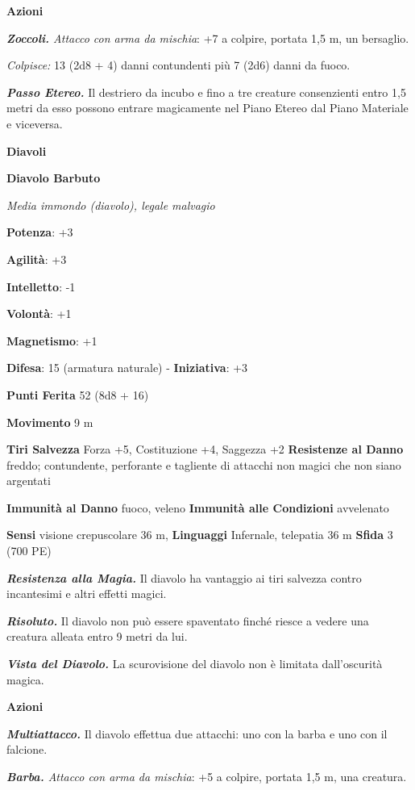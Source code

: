 \begin{multicols}{2}
\textbf{Azioni}

\emph{\textbf{Zoccoli.} Attacco con arma da mischia}: +7 a colpire,
portata 1,5 m, un bersaglio.

\emph{Colpisce:} 13 (2d8 + 4) danni contundenti più 7 (2d6) danni da
fuoco.

\emph{\textbf{Passo Etereo.}} Il destriero da incubo e fino a tre
creature consenzienti entro 1,5 metri da esso possono entrare
magicamente nel Piano Etereo dal Piano Materiale e viceversa.

\textbf{Diavoli}

\textbf{Diavolo Barbuto}

\emph{Media immondo (diavolo), legale malvagio}

\textbf{Potenza}: +3

\textbf{Agilità}: +3

\textbf{Intelletto}: -1

\textbf{Volontà}: +1

\textbf{Magnetismo}: +1

\textbf{Difesa}: 15 (armatura naturale) - \textbf{Iniziativa}: +3

\textbf{Punti Ferita} 52 (8d8 + 16)

\textbf{Movimento} 9 m

\textbf{Tiri Salvezza} Forza +5, Costituzione +4, Saggezza +2
\textbf{Resistenze al Danno} freddo; contundente, perforante e tagliente
di attacchi non magici che non siano argentati

\textbf{Immunità al Danno} fuoco, veleno \textbf{Immunità alle
Condizioni} avvelenato

\textbf{Sensi} visione crepuscolare 36 m, 
\textbf{Linguaggi} Infernale, telepatia 36 m \textbf{Sfida} 3 (700 PE)

\emph{\textbf{Resistenza alla Magia.}} Il diavolo ha vantaggio ai tiri
salvezza contro incantesimi e altri effetti magici.

\emph{\textbf{Risoluto.}} Il diavolo non può essere spaventato finché
riesce a vedere una creatura alleata entro 9 metri da lui.

\emph{\textbf{Vista del Diavolo.}} La scurovisione del diavolo non è
limitata dall'oscurità magica.

\textbf{Azioni}

\emph{\textbf{Multiattacco.}} Il diavolo effettua due attacchi: uno con
la barba e uno con il falcione.

\emph{\textbf{Barba.} Attacco con arma da mischia}: +5 a colpire,
portata 1,5 m, una creatura.


\end{multicols}
